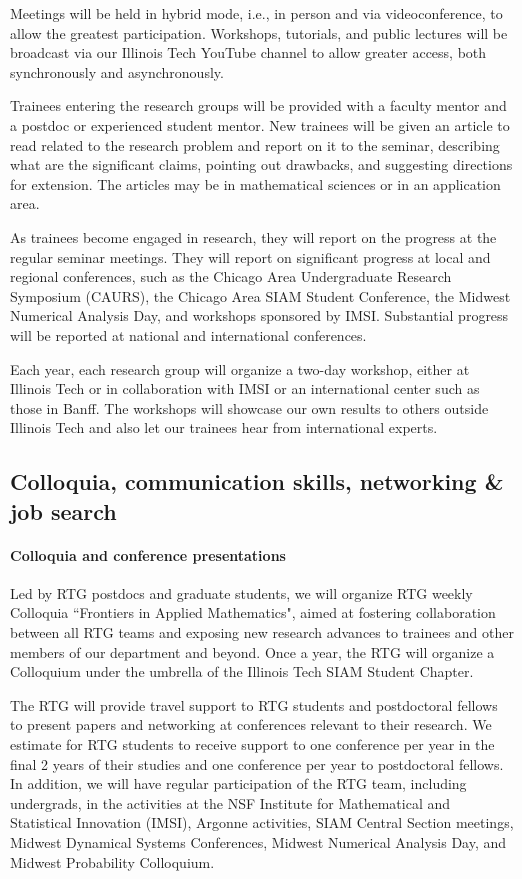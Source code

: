 \documentclass[11pt]{NSFamsart}
\newcommand{\bfparagraph}[1]{\paragraph{\textbf{\textup{#1}}}}
\begin{document}
Meetings will be held in hybrid mode, i.e., in person and via videoconference, to allow the greatest participation.  Workshops, tutorials, and public lectures will be broadcast via our Illinois Tech YouTube channel to allow greater access, both synchronously and asynchronously.

Trainees entering the research groups will be provided with a faculty mentor and a postdoc or experienced student mentor.  New trainees will be given an article to read related to the research problem and report on it to the seminar, describing what are the significant claims, pointing out drawbacks, and suggesting directions for extension. The articles may be in mathematical sciences or in an application area.

As trainees become engaged in research, they will report on the progress at the regular seminar meetings. They will report on significant progress at local and regional conferences, such as the Chicago Area Undergraduate Research Symposium (CAURS), the Chicago Area SIAM Student Conference, the Midwest Numerical Analysis Day, and workshops sponsored by IMSI.  Substantial progress will be reported at national and international conferences.

Each year, each research group will organize a two-day workshop, either at Illinois Tech or in collaboration with IMSI or an international center such as those in Banff.  The workshops will showcase our own results to others outside Illinois Tech and also let our trainees hear from international experts. 






\subsection{Colloquia, communication skills, networking \& job search}

\bfparagraph{Colloquia and conference presentations}
Led by RTG postdocs and graduate students, we will organize RTG  weekly   Colloquia ``Frontiers in Applied Mathematics",  aimed at fostering collaboration between all RTG teams and exposing new research advances to trainees and other members of our department and beyond.   
Once a year, the RTG  will organize a Colloquium  under the umbrella of the Illinois Tech SIAM Student Chapter.  

 
The RTG will provide travel support to RTG students and postdoctoral fellows to   present
papers and networking at conferences relevant to their research. We estimate for RTG students to receive support to one
conference per year in the final 2 years of their studies and one conference per year to postdoctoral fellows.
In addition, we will have regular participation of the  RTG team, including undergrads, in the  activities at the NSF Institute for Mathematical and Statistical Innovation (IMSI),  Argonne activities, SIAM Central Section meetings, Midwest Dynamical Systems Conferences, Midwest Numerical Analysis Day, and Midwest Probability Colloquium.  
\end{document}

